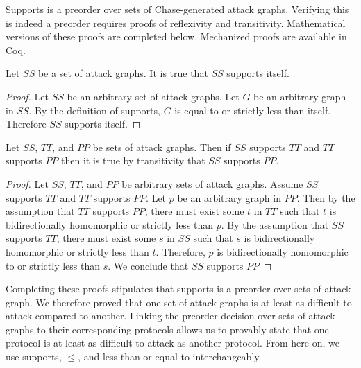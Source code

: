 \documentclass[runningheads]{llncs}
\theoremstyle{definition}
\begin{document}

\noindent Supports is a preorder over sets of Chase-generated attack graphs. Verifying this is indeed a preorder requires proofs of reflexivity and transitivity. Mathematical versions of these proofs are completed below. Mechanized proofs are available in Coq.  

\begin{theorem}
    Let $SS$ be a set of attack graphs. It is true that $SS$ supports itself.
\end{theorem}
\begin{proof}    
    Let $SS$ be an arbitrary set of attack graphs. Let $G$ be an arbitrary graph in $SS$. By the definition of supports, $G$ is equal to or strictly less than itself. Therefore $SS$ supports itself. 
\end{proof}

\begin{theorem}
    Let $SS$, $TT$, and $PP$ be sets of attack graphs. Then if $SS$ supports $TT$ and $TT$ supports $PP$ then it is true by transitivity that $SS$ supports $PP$. 
\end{theorem}
\begin{proof}
    Let $SS$, $TT$, and $PP$ be arbitrary sets of attack graphs. Assume $SS$ supports $TT$ and $TT$ supports $PP$. Let $p$ be an arbitrary graph in $PP$. Then by the assumption that $TT$ supports $PP$, there must exist some $t$ in $TT$ such that $t$ is bidirectionally homomorphic or strictly less than $p$. By the assumption that $SS$ supports $TT$, there must exist some $s$ in $SS$ such that $s$ is bidirectionally homomorphic or strictly less than $t$. Therefore, $p$ is bidirectionally homomorphic to or strictly less than $s$. We conclude that $SS$ supports $PP$
\end{proof}

\noindent Completing these proofs stipulates that supports is a preorder over sets of attack graph. We therefore proved that one set of attack graphs is at least as difficult to attack compared to another. Linking the preorder decision over sets of attack graphs to their corresponding protocols allows us to provably state that one protocol is at least as difficult to attack as another protocol. From here on, we use supports, $\leq$, and less than or equal to interchangeably. 
\end{document}
